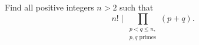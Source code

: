 Find all positive integers $n > 2$ such that
\[ n! \mid \prod_{\substack{p<q\le n, \\ p,q \text{ primes}}} (p+q). \]

